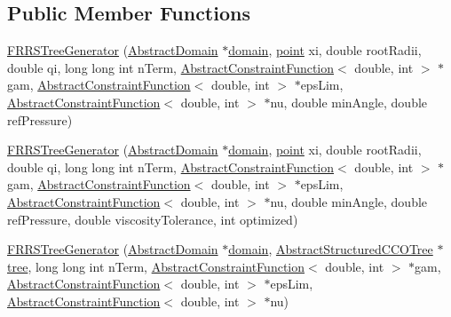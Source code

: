 \subsection*{Public Member Functions}
\begin{DoxyCompactItemize}
\item 
\hyperlink{class_f_r_r_s_tree_generator_a4089df88fb5f79d6484a300ea1e9f23e}{F\+R\+R\+S\+Tree\+Generator} (\hyperlink{class_abstract_domain}{Abstract\+Domain} $\ast$\hyperlink{class_f_r_r_s_tree_generator_a0322f396324a87545b29a7abce226ba6}{domain}, \hyperlink{structpoint}{point} xi, double root\+Radii, double qi, long long int n\+Term, \hyperlink{class_abstract_constraint_function}{Abstract\+Constraint\+Function}$<$ double, int $>$ $\ast$gam, \hyperlink{class_abstract_constraint_function}{Abstract\+Constraint\+Function}$<$ double, int $>$ $\ast$eps\+Lim, \hyperlink{class_abstract_constraint_function}{Abstract\+Constraint\+Function}$<$ double, int $>$ $\ast$nu, double min\+Angle, double ref\+Pressure)
\item 
\hyperlink{class_f_r_r_s_tree_generator_a147392a75aa6c3e6a51ee0fc56065064}{F\+R\+R\+S\+Tree\+Generator} (\hyperlink{class_abstract_domain}{Abstract\+Domain} $\ast$\hyperlink{class_f_r_r_s_tree_generator_a0322f396324a87545b29a7abce226ba6}{domain}, \hyperlink{structpoint}{point} xi, double root\+Radii, double qi, long long int n\+Term, \hyperlink{class_abstract_constraint_function}{Abstract\+Constraint\+Function}$<$ double, int $>$ $\ast$gam, \hyperlink{class_abstract_constraint_function}{Abstract\+Constraint\+Function}$<$ double, int $>$ $\ast$eps\+Lim, \hyperlink{class_abstract_constraint_function}{Abstract\+Constraint\+Function}$<$ double, int $>$ $\ast$nu, double min\+Angle, double ref\+Pressure, double viscosity\+Tolerance, int optimized)
\item 
\hyperlink{class_f_r_r_s_tree_generator_aa736ce95767783ce3a652e588ea3ffbd}{F\+R\+R\+S\+Tree\+Generator} (\hyperlink{class_abstract_domain}{Abstract\+Domain} $\ast$\hyperlink{class_f_r_r_s_tree_generator_a0322f396324a87545b29a7abce226ba6}{domain}, \hyperlink{class_abstract_structured_c_c_o_tree}{Abstract\+Structured\+C\+C\+O\+Tree} $\ast$\hyperlink{class_f_r_r_s_tree_generator_a9ff03e7c286d96e19d2fa658d167f519}{tree}, long long int n\+Term, \hyperlink{class_abstract_constraint_function}{Abstract\+Constraint\+Function}$<$ double, int $>$ $\ast$gam, \hyperlink{class_abstract_constraint_function}{Abstract\+Constraint\+Function}$<$ double, int $>$ $\ast$eps\+Lim, \hyperlink{class_abstract_constraint_function}{Abstract\+Constraint\+Function}$<$ double, int $>$ $\ast$nu)

\end{DoxyCompactItemize}
